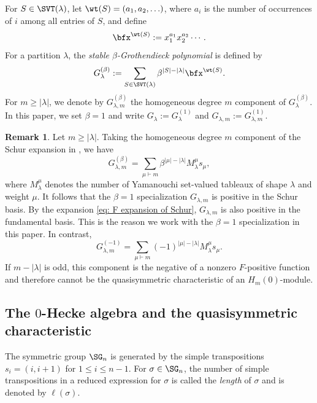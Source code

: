 \documentclass[12pt, reqno]{amsart}
\numberwithin{equation}{section}
\numberwithin{figure}{section}
\numberwithin{table}{section}
\theoremstyle{definition}
\newtheorem{remark}[theorem]{Remark}
\begin{document}
For $S\in \SVT(\lambda)$, let $\wt(S)=(a_1,a_2,\ldots)$, where $a_i$ is the number of occurrences of $i$ among all entries of $S$, and define
\[
\bfx^{\wt(S)}:=x_1^{a_1}x_2^{a_2}\cdots .
\]
For a partition $\lambda$, the \emph{stable $\beta$-Grothendieck polynomial} is defined by
\[
G_\lambda^{(\beta)}
:=\sum_{S\in \SVT(\lambda)}
\beta^{|S|-|\lambda|} \bfx^{\wt(S)}.
\]
For $m\ge |\lambda|$, we denote by $G_{\lambda,m}^{(\beta)}$ the homogeneous degree $m$ component of $G_\lambda^{(\beta)}$.
In this paper, we set $\beta=1$ and write $G_\lambda:=G_\lambda^{(1)}$ and $G_{\lambda,m}:=G_{\lambda,m}^{(1)}$.


\begin{remark}
Let $m \ge |\lambda|$.
Taking the homogeneous degree $m$ component of the Schur expansion in
\cite[Corollary~3.11]{MPS21}, we have
\[
G_{\lambda,m}^{(\beta)} = \sum_{\mu \vdash m} \beta^{|\mu|-|\lambda|} M_{\lambda}^\mu s_\mu,
\]
where $M_{\lambda}^\mu$ denotes the number of Yamanouchi set-valued tableaux of shape $\lambda$ and weight $\mu$.
It follows that the $\beta=1$ specialization $G_{\lambda,m}$ is positive in the Schur basis.
By the expansion \cref{eq: F expansion of Schur}, $G_{\lambda,m}$ is also positive in the fundamental basis.
This is the reason we work with the $\beta=1$ specialization in this paper.
In contrast, 
\[
G_{\lambda,m}^{(-1)} = \sum_{\mu \vdash m} (-1)^{|\mu|-|\lambda|} M_{\lambda}^\mu s_\mu.
\]
If $m-|\lambda|$ is odd, this component is the negative of a nonzero $F$-positive function and therefore cannot be the quasisymmetric characteristic of an $H_m(0)$-module.
\end{remark}





\subsection[The 0-Hecke algebra and the quasisymmetric characteristic]
{The \texorpdfstring{$0$}{0}-Hecke algebra and the quasisymmetric characteristic}
\label{subsec: 0hecke prelim}

The symmetric group $\SG_n$ is generated by the simple transpositions $s_i=(i,i+1)$ for $1\le i\le n-1$. 
For $\sigma \in \SG_n$, the number of simple transpositions in a reduced expression for $\sigma$ is called the \emph{length} of $\sigma$ and is denoted by $\ell(\sigma)$.
\end{document}
